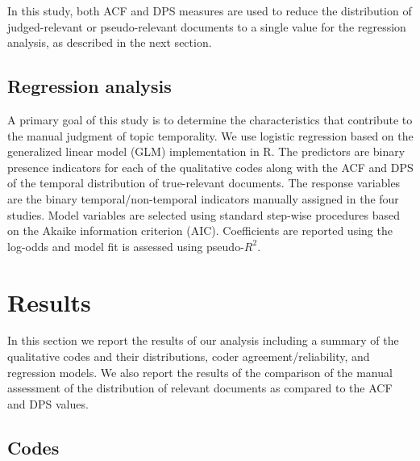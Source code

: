\documentclass[runningheads,a4paper]{llncs}
\begin{document}
In this study, both ACF and DPS measures are used to reduce the distribution of judged-relevant or pseudo-relevant documents to a single value for the regression analysis, as described in the next section.

\subsection{Regression analysis}

A primary goal of this study is to determine the characteristics that contribute to the manual judgment of topic temporality. We use logistic regression based on the generalized linear model (GLM) implementation in R. The predictors are binary presence indicators for each of the qualitative codes along with the ACF and DPS of the temporal distribution of true-relevant documents.  The response variables are the binary temporal/non-temporal indicators manually assigned in the four studies.  Model variables are selected using standard step-wise procedures based on the Akaike information criterion (AIC). Coefficients are reported using the log-odds and model fit is assessed using pseudo-$R^2$.

\section{Results}

In this section we report the results of our analysis including a summary of the qualitative codes and their distributions, coder agreement/reliability, and regression models. We also report the results of the comparison of the manual assessment of the distribution of relevant documents as compared to the ACF and DPS values.

\subsection{Codes}
\end{document}
